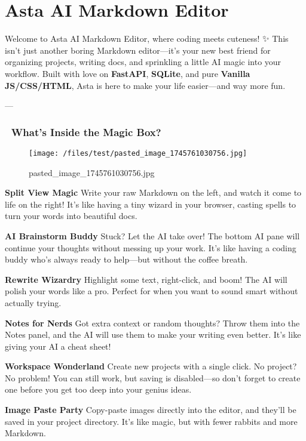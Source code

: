 \documentclass[12pt, a4paper, onecolumn, oneside]{report}
\begin{document}
\chapter{Asta AI Markdown Editor}

Welcome to Asta AI Markdown Editor, where coding meets cuteness! ✨ This isn’t just another boring Markdown editor—it’s your new best friend for organizing projects, writing docs, and sprinkling a little AI magic into your workflow. Built with love on \textbf{FastAPI}, \textbf{SQLite}, and pure \textbf{Vanilla JS/CSS/HTML}, Asta is here to make your life easier—and way more fun.

---

\subsection{🎉 What’s Inside the Magic Box?}

\begin{figure}[ht]
  \centering
  \texttt{[image: /files/test/pasted\_image\_1745761030756.jpg]}
  \caption{pasted_image_1745761030756.jpg}
  \label{fig:pasted_image_1745761030756}
\end{figure}


\textbf{Split View Magic}
Write your raw Markdown on the left, and watch it come to life on the right! It’s like having a tiny wizard in your browser, casting spells to turn your words into beautiful docs.

\textbf{AI Brainstorm Buddy}
Stuck? Let the AI take over! The bottom AI pane will continue your thoughts without messing up your work. It’s like having a coding buddy who’s always ready to help—but without the coffee breath.

\textbf{Rewrite Wizardry}
Highlight some text, right-click, and boom! The AI will polish your words like a pro. Perfect for when you want to sound smart without actually trying.

\textbf{Notes for Nerds}
Got extra context or random thoughts? Throw them into the Notes panel, and the AI will use them to make your writing even better. It’s like giving your AI a cheat sheet!

\textbf{Workspace Wonderland}
Create new projects with a single click. No project? No problem! You can still work, but saving is disabled—so don’t forget to create one before you get too deep into your genius ideas.

\textbf{Image Paste Party}
Copy-paste images directly into the editor, and they’ll be saved in your project directory. It’s like magic, but with fewer rabbits and more Markdown.
\end{document}
